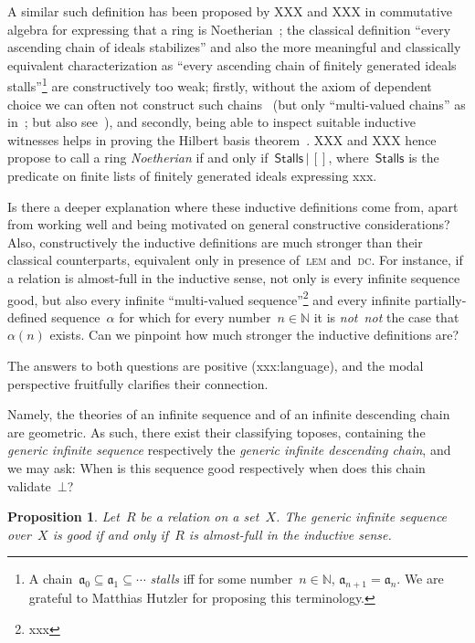 \documentclass[oneside,reqno]{amsart}
\theoremstyle{definition}
\theoremstyle{plain}
\newtheorem{prop}[defn]{Proposition}
\theoremstyle{remark}
\newcommand{\aaa}{\mathfrak{a}}
\newcommand{\NN}{\mathbb{N}}
\renewcommand{\_}{\mathpunct{.}\,}
\newcommand{\notnot}{\emph{not~not}\xspace}
\newcommand{\?}{\,{:}\,}
\begin{document}
A similar such definition has been proposed by XXX and XXX in commutative
algebra for expressing that a ring is Noetherian~\cite{xxx}; the classical
definition ``every ascending chain of ideals stabilizes'' and also the more
meaningful and classically equivalent characterization as ``every ascending
chain of finitely generated ideals stalls''\footnote{A chain~$\aaa_0 \subseteq
\aaa_1 \subseteq \cdots$ \emph{stalls} iff for some number~$n \in \NN$,
$\aaa_{n+1} = \aaa_n$. We are grateful to Matthias Hutzler for proposing this
terminology.} are constructively too weak; firstly, without the axiom of
dependent choice we can often not construct such chains~\cite{richman:xxx} (but only
``multi-valued chains'' as in~\cite[Section~3.9]{blechschmidt:phd}; but also
see~\cite{richman:xxx}), and secondly, being able to inspect suitable inductive
witnesses helps in proving the Hilbert basis theorem~\cite{xxx}. XXX and XXX
hence propose to call a ring \emph{Noetherian} if and only if~$\mathsf{Stalls}
\,|\, []$, where~$\mathsf{Stalls}$ is the predicate on finite lists of finitely
generated ideals expressing xxx.

Is there a deeper explanation where these inductive definitions come from,
apart from working well and being motivated on general constructive
considerations? Also, constructively the inductive definitions are much
stronger than their classical counterparts, equivalent only in presence
of~\textsc{lem} and~\textsc{dc}. For instance, if a relation is almost-full in
the inductive sense, not only is every infinite sequence good, but also every
infinite ``multi-valued sequence''\footnote{xxx} and every infinite
partially-defined sequence~$\alpha$ for which for every number~$n \in \NN$ it
is \notnot the case that~$\alpha(n)$ exists. Can we pinpoint how much stronger
the inductive definitions are?

The answers to both questions are positive (xxx:language), and the modal
perspective fruitfully clarifies their connection.

Namely, the theories of an infinite sequence and of an infinite descending chain
are geometric. As such, there exist their classifying toposes, containing the
\emph{generic infinite sequence} respectively the \emph{generic infinite
descending chain}, and we may ask: When is this sequence good respectively when
does this chain validate~$\bot$?

\begin{prop}\label{prop:gen-good}Let~$R$ be a relation on a set~$X$. The
generic infinite sequence over~$X$ is good if and only if~$R$ is almost-full in
the inductive sense.\end{prop}
\end{document}
